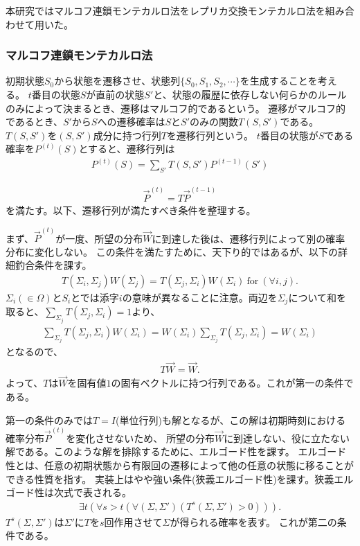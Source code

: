 \documentclass[12pt,titlepage,dvipdfmx]{jarticle}
\begin{document}
本研究ではマルコフ連鎖モンテカルロ法をレプリカ交換モンテカルロ法を組み合わせて用いた。

\subsubsection{マルコフ連鎖モンテカルロ法}

初期状態$S_0$から状態を遷移させ、状態列$\{S_0,S_1,S_2,\cdots\}$を生成することを考える。
$t$番目の状態$S$が直前の状態$S'$と、状態の履歴に依存しない何らかのルールのみによって決まるとき、遷移はマルコフ的であるという。
遷移がマルコフ的であるとき、$S'$から$S$への遷移確率は$S$と$S'$のみの関数$T(S,S')$である。
$T(S,S')$を$(S,S')$成分に持つ行列$T$を遷移行列という。
$t$番目の状態が$S$である確率を$P^{(t)}(S)$とすると、遷移行列は
\begin{align}
   P^{(t)}(S) = \sum_{S'} T(S,S')P^{(t-1)}(S')
\end{align}

\begin{align}
   \vec{P}^{(t)} =  T\vec{P}^{(t-1)}
\end{align}
を満たす。以下、遷移行列が満たすべき条件を整理する。

まず、$\vec{P}^{(t)}$が一度、所望の分布$\vec{W}$に到達した後は、遷移行列によって別の確率分布に変化しない。
この条件を満たすために、天下り的ではあるが、以下の詳細釣合条件を課す。
\begin{align}
   T(\Sigma_i,\Sigma_j)W(\Sigma_j) = T(\Sigma_j,\Sigma_i)W(\Sigma_i) \ \mathrm{for}\  (\forall i,j).
\end{align}
$\Sigma_i(\in\Omega)$と$S_i$とでは添字$i$の意味が異なることに注意。両辺を$\Sigma_j$について和を取ると、$\sum_{\Sigma_j}T(\Sigma_j,\Sigma_i)=1$より、
\begin{align}
   \sum_{\Sigma_j}T(\Sigma_j,\Sigma_i)W(\Sigma_i) = W(\Sigma_i)\sum_{\Sigma_j}T(\Sigma_j,\Sigma_i) = W(\Sigma_i)
\end{align}
となるので、
\begin{align}
   T\vec{W} = \vec{W}.
\end{align}
よって、$T$は$\vec{W}$を固有値$1$の固有ベクトルに持つ行列である。これが第一の条件である。

第一の条件のみでは$T=I$(単位行列)も解となるが、この解は初期時刻における確率分布$\vec{P}^{(t)}$を変化させないため、
所望の分布$\vec{W}$に到達しない、役に立たない解である。このような解を排除するために、エルゴード性を課す。
エルゴード性とは、任意の初期状態から有限回の遷移によって他の任意の状態に移ることができる性質を指す。
実装上はやや強い条件(狭義エルゴード性)を課す。狭義エルゴード性は次式で表される。
\begin{align}
   \exists t (\forall s > t(\forall (\Sigma,\Sigma')(T^s(\Sigma,\Sigma')>0))).
\end{align}
$T^s(\Sigma,\Sigma')$は$\Sigma'$に$T$を$s$回作用させて$\Sigma$が得られる確率を表す。
これが第二の条件である。
\end{document}
